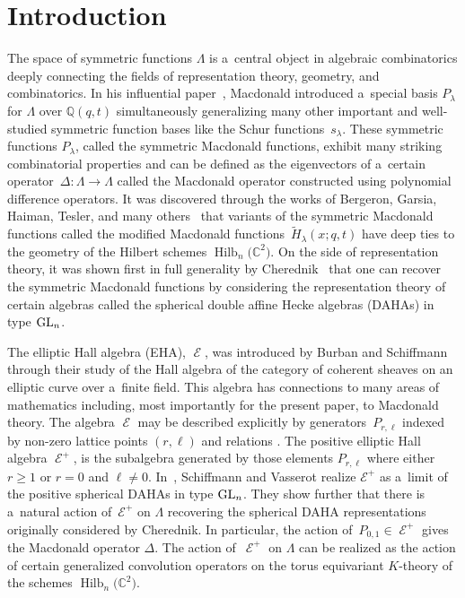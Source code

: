 \documentclass[pdftex]{sigma}
\numberwithin{equation}{section}
\theoremstyle{definition}
\DeclareMathOperator{\sE}{\mathcal{E}}
\DeclareMathOperator{\Hilb}{\mathrm{Hilb}}
\begin{document}
\section{Introduction}
The space of symmetric functions $\Lambda$ is a~central object in algebraic combinatorics deeply connecting the fields of representation theory, geometry, and combinatorics. In his influential paper~\cite{MacDSLC}, Macdonald introduced a~special basis $P_{\lambda}$ for $\Lambda$ over $\mathbb{Q}(q,t)$ simultaneously generalizing many other important and well-studied symmetric function bases like the Schur functions~$s_{\lambda}$. These symmetric functions $P_{\lambda}$, called the symmetric Macdonald functions, exhibit many striking combinatorial properties and can be defined as the eigenvectors of a~certain operator~${\Delta\colon \Lambda \rightarrow \Lambda}$ called the Macdonald operator constructed using polynomial difference operators. It was discovered through the works of Bergeron, Garsia, Haiman, Tesler, and many others~\cite{BGSciFi,BGHT, haiman2000hilbert} that variants of the symmetric Macdonald functions called the modified Macdonald functions~$\widetilde{H}_{\lambda}(x;q,t)$ have deep ties to the geometry of the Hilbert schemes $\Hilb_n\bigl(\mathbb{C}^2\bigr)$. On the side of representation theory, it was shown first in full generality by Cherednik~\cite{C_2001} that one can recover the symmetric Macdonald functions by considering the representation theory of certain algebras called the spherical double affine Hecke algebras (DAHAs) in type ${\rm GL}_n$.

The elliptic Hall algebra (EHA), $\sE$, was introduced by Burban and Schiffmann~\cite{BS} through their study of the Hall algebra of the category of coherent sheaves on an elliptic curve over a~finite field. This algebra has connections to many areas of mathematics including, most importantly for the present paper, to Macdonald theory. The algebra $\sE$ may be described explicitly by generators~$P_{r,\ell}$ indexed by non-zero lattice points $(r,\ell)$ and relations \cite[Theorem~5.4]{BS}. The positive elliptic Hall algebra $\sE^{+}$, is the subalgebra generated by those elements $P_{r,\ell}$ where either~${r\geq 1}$ or $r=0$ and $\ell \neq 0$. In~\cite{SV2}, Schiffmann and Vasserot realize $\mathcal{E}^{+}$ as a~limit of the positive spherical DAHAs in type ${\rm GL}_n$.
 They show further that there is a~natural action of~$\mathcal{E}^{+}$ on $\Lambda$ recovering the spherical DAHA representations originally considered by Cherednik. In particular, the action of~$P_{0,1} \in \sE^{+}$ gives the Macdonald operator $\Delta$. The action of~$\sE^{+}$ on $\Lambda$ can be realized as the action of certain generalized convolution operators on the torus equivariant $K$-theory of the schemes $\Hilb_n\bigl(\mathbb{C}^2\bigr)$.
\end{document}

